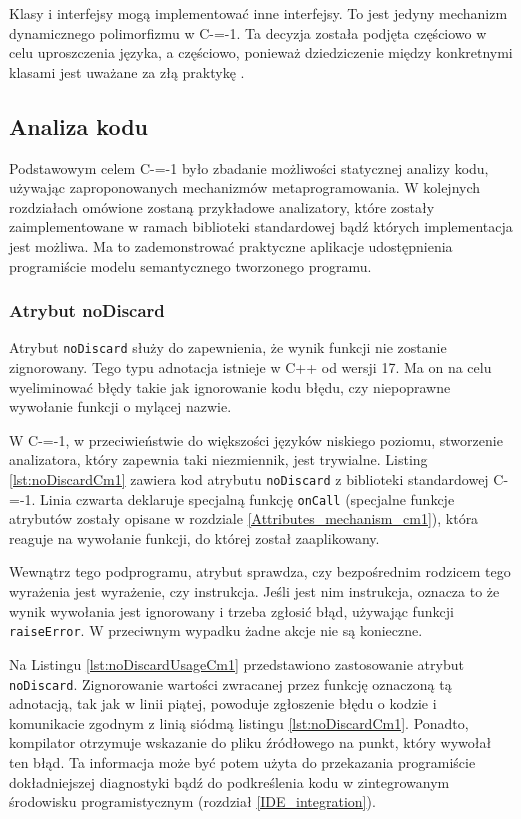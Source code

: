 Klasy i interfejsy mogą implementować inne interfejsy.
To jest jedyny mechanizm dynamicznego polimorfizmu w C-=-1.
Ta decyzja została podjęta częściowo w celu uproszczenia języka, a częściowo, ponieważ dziedziczenie między konkretnymi klasami jest uważane za złą praktykę \cite{gang_of_four:design_patterns}.

\subsection{Analiza kodu}
\label{code_analysis}
Podstawowym celem C-=-1 było zbadanie możliwości statycznej analizy kodu, używając zaproponowanych mechanizmów metaprogramowania.
W kolejnych rozdziałach omówione zostaną przykładowe analizatory, które zostały zaimplementowane w ramach biblioteki standardowej bądź których implementacja jest możliwa.
Ma to zademonstrować praktyczne aplikacje udostępnienia programiście modelu semantycznego tworzonego programu.



\subsubsection{Atrybut noDiscard}
\label{no_discard}

Atrybut \lstinline{noDiscard} służy do zapewnienia, że wynik funkcji nie zostanie zignorowany.
Tego typu adnotacja istnieje w C++ od wersji 17\cite{ISO:cpp17}.
Ma on na celu wyeliminować błędy takie jak ignorowanie kodu błędu, czy niepoprawne wywołanie funkcji o mylącej nazwie.

W C-=-1, w przeciwieństwie do większości języków niskiego poziomu, stworzenie analizatora, który zapewnia taki niezmiennik, jest trywialne.
Listing \ref{lst:noDiscardCm1} zawiera kod atrybutu \lstinline{noDiscard} z biblioteki standardowej C-=-1.
Linia czwarta deklaruje specjalną funkcję \lstinline{onCall} (specjalne funkcje atrybutów zostały opisane w rozdziale \ref{Attributes_mechanism_cm1}), która reaguje na wywołanie funkcji, do której został zaaplikowany.

Wewnątrz tego podprogramu, atrybut sprawdza, czy bezpośrednim rodzicem tego wyrażenia jest wyrażenie, czy instrukcja.
Jeśli jest nim instrukcja, oznacza to że wynik wywołania jest ignorowany i trzeba zgłosić błąd, używając funkcji \lstinline{raiseError}.
W przeciwnym wypadku żadne akcje nie są konieczne.

Na Listingu \ref{lst:noDiscardUsageCm1} przedstawiono zastosowanie atrybut \lstinline{noDiscard}.
Zignorowanie wartości zwracanej przez funkcję oznaczoną tą adnotacją, tak jak w linii piątej, powoduje zgłoszenie błędu o kodzie i komunikacie zgodnym z linią siódmą listingu \ref{lst:noDiscardCm1}.
Ponadto, kompilator otrzymuje wskazanie do pliku źródłowego na punkt, który wywołał ten błąd.
Ta informacja może być potem użyta do przekazania programiście dokładniejszej diagnostyki bądź do podkreślenia kodu w zintegrowanym środowisku programistycznym (rozdział \ref{IDE_integration}).

